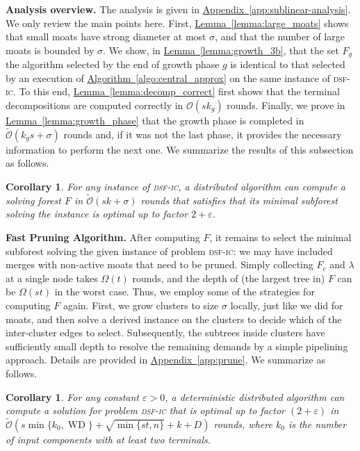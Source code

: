 \documentclass[letterpaper,11pt]{article}
\newtheorem{corollary}[theorem]{Corollary}
\newcommand{\namedref}[2]{\hyperref[#2]{#1~\ref*{#2}}}
\newcommand{\lemmaref}[1]{\namedref{Lemma}{#1}}
\newcommand{\appref}[1]{\namedref{Appendix}{#1}}
\newcommand{\algref}[1]{\namedref{Algorithm}{#1}}
\newcommand{\BO}{\mathcal{O}}
\newcommand{\sO}{\tilde{\mathcal{O}}}
\newcommand{\Comp}{\lambda}
\DeclareMathOperator{\WD}{WD}
\newcommand{\sfic}{\textsc{dsf-ic}\xspace}
\renewcommand{\paragraph}[1]{\smallskip\par\noindent\textbf{#1}}
\begin{document}
\paragraph{Analysis overview.}
The analysis is given in \appref{app:sublinear-analysis}. We only review the
main points here.  First, \lemmaref{lemma:large_moats} shows that
small moats have strong diameter at most $\sigma$, and that the number
of large moats is bounded by $\sigma$.
We show, in \lemmaref{lemma:growth_3b}, that the set $F_g$ the
algorithm selected by the end of growth phase $g$ is identical to that selected
by an execution of \algref{algo:central_approx} on the same instance of \sfic.
To this end, \lemmaref{lemma:decomp_correct} first shows
that the terminal decompositions are computed correctly in 
 $\BO(sk_g)$ rounds.
Finally, we prove in \lemmaref{lemma:growth_phase} that the growth
 phase is completed in $\sO(k_gs+\sigma)$ rounds and, if it was not
 the last phase, it provides the necessary information to perform the
 next one.  We summarize the results of this subsection as follows.

\begin{corollary}\label{coro:growth}
For any instance of \sfic, a distributed algorithm can compute a solving forest
$F$ in $\sO(sk+\sigma)$ rounds that satisfies that its minimal subforest solving
the instance is optimal up to factor $2+\varepsilon$.
\end{corollary}

\paragraph{Fast Pruning Algorithm.}
\label{sec:prune}
After computing $F$, it remains to select the minimal
subforest solving the given instance of problem \sfic: we may have
included merges with non-active moats that need to be pruned.
Simply collecting $F_c$ and $\Comp$ at a single node takes
$\Omega(t)$ rounds, and the depth of (the largest tree in) $F$ can be
$\Omega(st)$ in the worst case. Thus, we employ some of the strategies for
computing $F$ again. First, we grow clusters to size $\sigma$ locally, just like
we did for moats, and then solve a derived instance on the clusters to decide
which of the inter-cluster edges to select. Subsequently, the subtrees inside
clusters have sufficiently small depth to resolve the remaining demands by a
simple pipelining approach. Details are provided in \appref{app:prune}. We
summarize as follows.
\begin{corollary}\label{coro:2+eps_distributed}
For any constant $\varepsilon>0$, a deterministic distributed algorithm can
compute a solution for problem \sfic that is optimal up to factor
$(2+\varepsilon)$ in $\sO(s\min\{k_0,\WD\}+\sqrt{\min\{st,n\}}+k+D)$ rounds,
where $k_0$ is the number of input components with at least two terminals.
\end{corollary}
\
\end{document}
